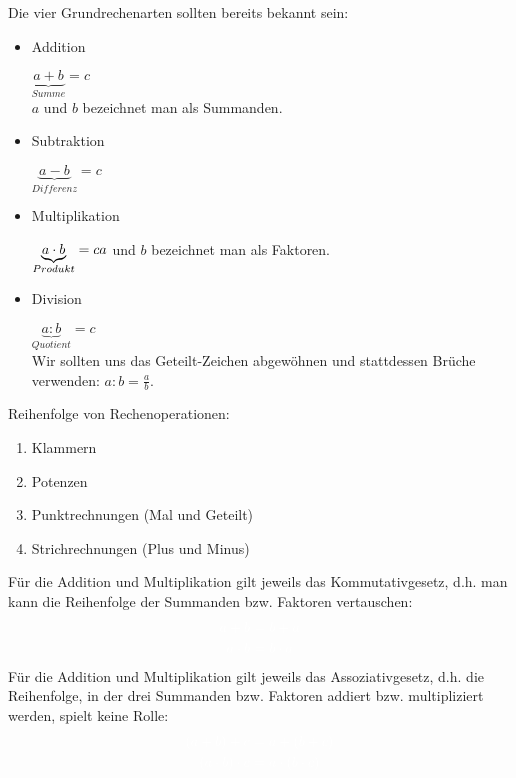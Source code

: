 Die vier Grundrechenarten sollten bereits bekannt sein:
\begin{tcolorbox}
	\begin{itemize}
		\item Addition
		
		\textcolor{loestc}{\(\underbrace{a+b}_{Summe}=c\)\\\(a\) und \(b\) bezeichnet man als Summanden.}
		
		\item Subtraktion
		
		\textcolor{loestc}{\(\underbrace{a-b}_{Differenz}=c\)}
		
		\item Multiplikation
		
		\textcolor{loestc}{\(\underbrace{a\cdot b}_{Produkt}=c$\\\(a\) und \(b\) bezeichnet man als Faktoren.}
		
		\item Division
		
		\textcolor{loestc}{\(\underbrace{a:b}_{Quotient}=c\)\\Wir sollten uns das Geteilt-Zeichen abgewöhnen und stattdessen Brüche verwenden: \(a:b=\frac{a}{b}\).}
	\end{itemize}
\end{tcolorbox}
Reihenfolge von Rechenoperationen:
\begin{enumerate}
	\item \textcolor{loes}{Klammern}
	\item \textcolor{loes}{Potenzen}
	\item \textcolor{loes}{Punktrechnungen (Mal und Geteilt)}
	\item \textcolor{loes}{Strichrechnungen (Plus und Minus)}
\end{enumerate}
Für die Addition und Multiplikation gilt jeweils das Kommutativgesetz, d.h. man kann die Reihenfolge der Summanden bzw. Faktoren vertauschen:
\begin{align*}
	\textcolor{loes}{a+b\ }&\textcolor{loes}{=b+a}\\
	\textcolor{loes}{a\cdot b\ }&\textcolor{loes}{=b\cdot a}
\end{align*}
Für die Addition und Multiplikation gilt jeweils das Assoziativgesetz, d.h. die Reihenfolge, in der drei Summanden bzw. Faktoren addiert bzw. multipliziert werden, spielt keine Rolle:
\begin{align*}
	\textcolor{loes}{\left( a+b\right) +c\ }&\textcolor{loes}{=a+\left( b+c\right) }\\
	\textcolor{loes}{\left( a\cdot b\right) \cdot c\ }&\textcolor{loes}{=a\cdot\left( b\cdot c\right) }
\end{align*}
